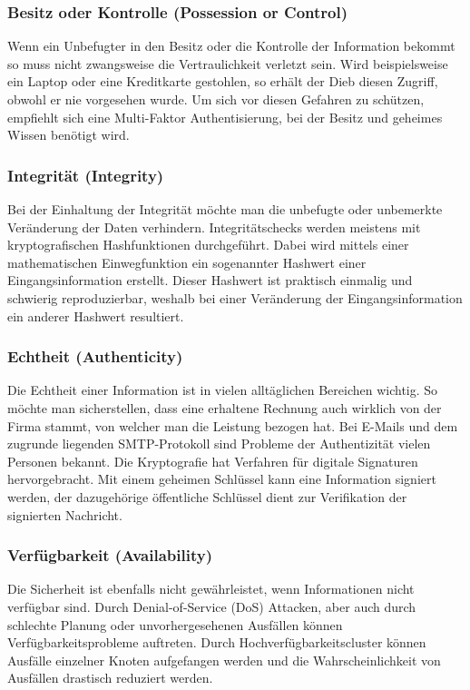 \subsubsection{Besitz oder Kontrolle (Possession or Control)}
Wenn ein Unbefugter in den Besitz oder die Kontrolle der Information bekommt so muss nicht zwangsweise die Vertraulichkeit verletzt sein. Wird beispielsweise ein Laptop oder eine Kreditkarte gestohlen, so erhält der Dieb diesen Zugriff, obwohl er nie vorgesehen wurde. Um sich vor diesen Gefahren zu schützen, empfiehlt sich eine Multi-Faktor Authentisierung, bei der Besitz und geheimes Wissen benötigt wird. 
\subsubsection{Integrität (Integrity)}
Bei der Einhaltung der Integrität möchte man die unbefugte oder unbemerkte Veränderung der Daten verhindern. Integritätschecks werden meistens mit kryptografischen Hashfunktionen durchgeführt. Dabei wird mittels einer mathematischen Einwegfunktion ein sogenannter Hashwert einer Eingangsinformation erstellt. Dieser Hashwert ist praktisch einmalig und schwierig reproduzierbar, weshalb bei einer Veränderung der Eingangsinformation ein anderer Hashwert resultiert. 
\subsubsection{Echtheit (Authenticity)}
Die Echtheit einer Information ist in vielen alltäglichen Bereichen wichtig. So möchte man sicherstellen, dass eine erhaltene Rechnung auch wirklich von der Firma stammt, von welcher man die Leistung bezogen hat. Bei E-Mails und dem zugrunde liegenden SMTP-Protokoll sind Probleme der Authentizität vielen Personen bekannt. Die Kryptografie hat Verfahren für digitale Signaturen hervorgebracht. Mit einem geheimen Schlüssel kann eine Information signiert werden, der dazugehörige öffentliche Schlüssel dient zur Verifikation der signierten Nachricht.
\subsubsection{Verfügbarkeit (Availability)}
Die Sicherheit ist ebenfalls nicht gewährleistet, wenn Informationen nicht verfügbar sind. Durch Denial-of-Service (DoS) Attacken, aber auch durch schlechte Planung oder unvorhergesehenen Ausfällen können Verfügbarkeitsprobleme auftreten. Durch Hochverfügbarkeitscluster können Ausfälle einzelner Knoten aufgefangen werden und die Wahrscheinlichkeit von Ausfällen drastisch reduziert werden.
